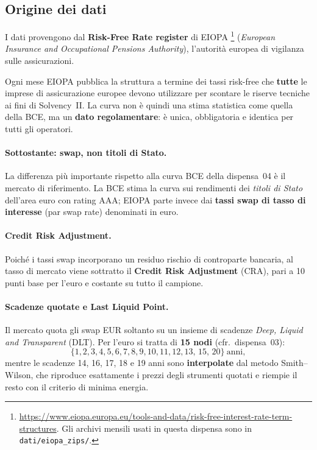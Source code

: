 \documentclass[11pt,a4paper]{article}
\newcommand{\CRA}{\ensuremath{\mathrm{CRA}}}
\theoremstyle{plain}
\theoremstyle{definition}
\theoremstyle{remark}
\begin{document}
\subsection{Origine dei dati}
\label{sec:origine-dati}

I dati provengono dal \textbf{Risk-Free Rate register} di EIOPA%
\footnote{\url{https://www.eiopa.europa.eu/tools-and-data/risk-free-interest-rate-term-structures}.
Gli archivi mensili usati in questa dispensa sono in \texttt{dati/eiopa\_zips/}.}
(\emph{European Insurance and Occupational Pensions Authority}), l'autorit\`a
europea di vigilanza sulle assicurazioni.

Ogni mese EIOPA pubblica la struttura a termine dei tassi risk-free che
\textbf{tutte} le imprese di assicurazione europee devono utilizzare per
scontare le riserve tecniche ai fini di Solvency~II. La curva non \`e quindi una
stima statistica come quella della BCE, ma un \textbf{dato regolamentare}: \`e
unica, obbligatoria e identica per tutti gli operatori.

\paragraph{Sottostante: swap, non titoli di Stato.}
La differenza pi\`u importante rispetto alla curva BCE della dispensa~04 \`e il
mercato di riferimento. La BCE stima la curva sui rendimenti dei
\emph{titoli di Stato} dell'area euro con rating AAA; EIOPA parte invece dai
\textbf{tassi swap di tasso di interesse} (par swap rate) denominati in euro.

\paragraph{Credit Risk Adjustment.}
Poich\'e i tassi swap incorporano un residuo rischio di controparte bancaria, al
tasso di mercato viene sottratto il \textbf{Credit Risk Adjustment} ($\CRA$),
pari a 10 punti base per l'euro e costante su tutto il campione.

\paragraph{Scadenze quotate e Last Liquid Point.}
Il mercato quota gli swap EUR soltanto su un insieme di scadenze
\emph{Deep, Liquid and Transparent} (DLT). Per l'euro si tratta di
\textbf{15 nodi} (cfr.\ dispensa~03):
\[
  \{1,2,3,4,5,6,7,8,9,10,11,12,13,\,15,\,20\}\ \text{anni},
\]
mentre le scadenze 14, 16, 17, 18 e 19 anni sono \textbf{interpolate} dal
metodo Smith--Wilson, che riproduce esattamente i prezzi degli strumenti
quotati e riempie il resto con il criterio di minima energia.
\end{document}
